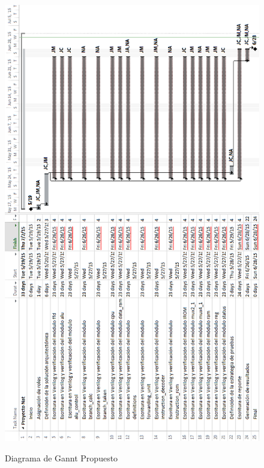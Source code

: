 \begin{figure}[hbtp]
\caption{Diagrama de Gannt Propuesto}
\centering
\includegraphics[scale=0.6]{imagenes/original.PNG}
\label{f:gannt_propuesto}
\end{figure}


